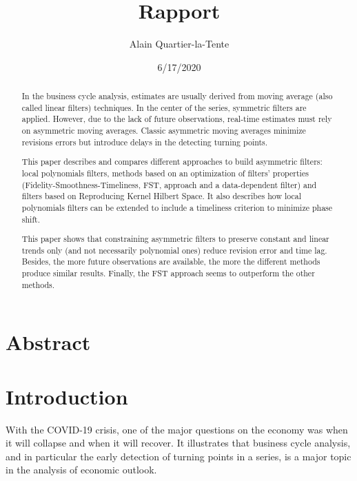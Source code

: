 \documentclass[
  12pt,
  ,
  a4paper]{article}
\title{Rapport}
\author{Alain Quartier-la-Tente}
\date{6/17/2020}
\newcommand\1{\mathds{1}}
\begin{document}
\maketitle

{
\hypersetup{linkcolor=}
\setcounter{tocdepth}{3}
\tableofcontents
}
\newpage

\hypertarget{abstract}{%
\section*{Abstract}\label{abstract}}

\begin{abstract}

In the business cycle analysis, estimates are usually derived from moving average (also called linear filters) techniques. 
In the center of the series, symmetric filters are applied. 
However, due to the lack of future observations, real-time estimates must rely on asymmetric moving averages.
Classic asymmetric moving averages minimize revisions errors but introduce delays in the detecting turning points.

This paper describes and compares different approaches to build asymmetric filters: local polynomials filters, methods based on an optimization of filters' properties (Fidelity-Smoothness-Timeliness, FST, approach and a data-dependent filter) and filters based on Reproducing Kernel Hilbert Space.
It also describes how local polynomials filters can be extended to include a timeliness criterion to minimize phase shift.

This paper shows that constraining asymmetric filters to preserve constant and linear trends only (and not necessarily polynomial ones) reduce revision error and time lag. 
Besides, the more future observations are available, the more the different methods produce similar results.
Finally, the FST approach seems to outperform the other methods.
\end{abstract}

\newpage

\hypertarget{introduction}{%
\section*{Introduction}\label{introduction}}

With the COVID-19 crisis, one of the major questions on the economy was when it will collapse and when it will recover.
It illustrates that business cycle analysis, and in particular the early detection of turning points in a series, is a major topic in the analysis of economic outlook.
\end{document}
